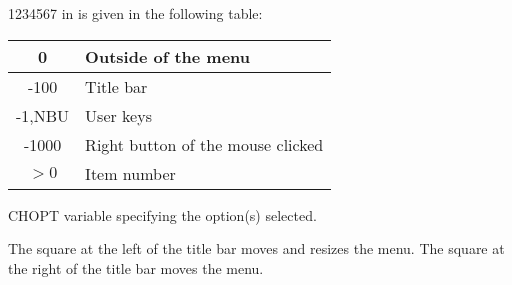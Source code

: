 \begin{DLtt}{1234567}
in  is given in the following table:
\begin{center}
\begin{tabular}{||c|l||}
\hline
0       & Outside of the menu \\
\hline
-100    & Title bar           \\
\hline
-1,NBU  & User keys           \\
\hline
-1000   & Right button of the mouse clicked \\
\hline
 $> 0$  & Item number         \\
\hline
\end{tabular}
\end{center}

\item[CHOPT]  variable specifying the option(s) selected.
\end{DLtt}
The square at the left of the title bar moves and resizes the menu.
The square at the right of the title bar moves the menu.

\newpage

